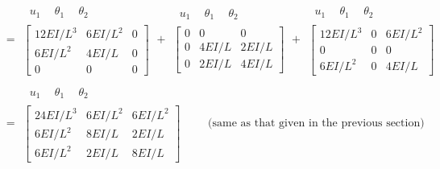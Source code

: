 \begin{example}
\leavevmode
\begin{fig}
  
\end{fig}
{\small
\begin{align*}
  [k] &= \begin{array}{c}\begin{array}{ccc}\ u_1\ & \ \theta_1\ & \ \theta_2\ \end{array}\\ \left[\begin{array}{ccc}12EI/L^3 & 6EI/L^2 & 0\\ 6EI/L^2 & 4EI/L & 0\\ 0 & 0 & 0\end{array}\right]\end{array}
  + \begin{array}{c}\begin{array}{ccc}\ u_1\ & \ \theta_1\ & \ \theta_2\ \end{array}\\ \left[\begin{array}{ccc}0 & 0 & 0\\ 0 & 4EI/L & 2EI/L\\ 0 & 2EI/L & 4EI/L\end{array}\right]\end{array}
  + \begin{array}{c}\begin{array}{ccc}\ u_1\ & \ \theta_1\ & \ \theta_2\ \end{array}\\ \left[\begin{array}{ccc}12EI/L^3 & 0 & 6EI/L^2\\ 0 & 0 & 0\\ 6EI/L^2 & 0 & 4EI/L\end{array}\right]\end{array}\\
  &= \begin{array}{c}\begin{array}{ccc}\ u_1\ & \ \theta_1\ & \ \theta_2\ \end{array}\\ \left[\begin{array}{ccc}24EI/L^3 & 6EI/L^2 & 6EI/L^2\\ 6EI/L^2 & 8EI/L & 2EI/L\\ 6EI/L^2 & 2EI/L & 8EI/L\end{array}\right]\end{array}\qquad\text{(same as that given in the previous section)}
\end{align*}}
\end{example}

